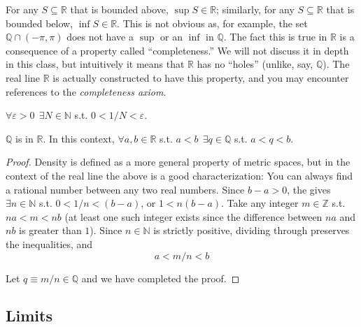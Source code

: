 \documentclass{article}
\begin{document}
\begin{remark}
  For any $S \subseteq \mathbb{R}$ that is bounded above, $\sup S \in \mathbb{R}$; similarly, for any $S \subseteq \mathbb{R}$ that is bounded below, $\inf S \in \mathbb{R}$. This is not obvious as, for example, the set $\mathbb{Q} \cap (-\pi, \pi)$ does not have a $\sup$ or an $\inf$ in $\mathbb{Q}$. The fact this is true in $\mathbb{R}$ is a consequence of a property called ``completeness.'' We will not discuss it in depth in this class, but intuitively it means that $\mathbb{R}$ has no ``holes'' (unlike, say, $\mathbb{Q}$). The real line $\mathbb{R}$ is actually constructed to have this property, and you may encounter references to the \textit{completeness axiom}.
\end{remark}

\begin{definitionx}\label{def:lecture1_archimedean}
  $\forall \varepsilon > 0 ~~ \exists N \in \mathbb{N}$ s.t. $0 < 1/N < \varepsilon$.
\end{definitionx}

\begin{claim}
  $\mathbb{Q}$ is  in $\mathbb{R}$. In this context, $\forall a, b \in \mathbb{R}$ s.t. $a < b ~~ \exists q \in \mathbb{Q}$ s.t. $a < q < b$.
\end{claim}

\begin{proof}
  Density is defined as a more general property of metric spaces, but in the context of the real line the above is a good characterization: You can always find a rational number between any two real numbers.  Since $b - a > 0$, the  gives $\exists n \in \mathbb{N}$ s.t. $0 < 1/n < (b - a)$, or $1 < n(b - a)$. Take any integer $m \in \mathbb{Z}$ s.t. $na < m < nb$ (at least one such integer exists since the difference between $na$ and $nb$ is greater than $1$). Since $n \in \mathbb{N}$ is strictly positive, dividing  through preserves the inequalities, and
  \[
    a < m/n < b
  \]

  Let $q \equiv m/n \in \mathbb{Q}$ and we have completed the proof.
\end{proof}

\subsection{Limits}
\label{sub:limits}
\end{document}
